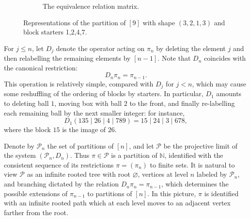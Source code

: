 \documentclass{article}
\begin{document}
\begin{figure}[htbp]
    \begin{subfigure}[b]{\textwidth}
        \centering
        \caption{The equivalence relation matrix.}\label{subfig:MatrixRep}
    \end{subfigure}

    \vspace{1.5em}
    \caption{Representations of the partition of $[9]$ with shape $(3,2,1,3)$ and block starters 1,2,4,7.}
    \label{CanRep}
\end{figure}













For $j\le n$, let $D_j$ denote the operator acting on $\pi_n$ by deleting the element $j$ and then relabelling the remaining elements by $[n-1]$.
Note that $D_n$ coincides with the canonical restriction:
\[
D_n\pi_n=\pi_{n-1}.
\]
This operation is relatively simple, compared with $D_j$ for $j<n$, which may cause some reshuffling of the ordering of blocks by starters.
In particular, $D_1$ amounts to deleting ball $1$, moving 
 box  with ball $2$ to the front, and finally
re-labelling each remaining ball by the next smaller integer: for instance,
\[
D_1(135 \mid 26 \mid 4 \mid 789)=15 \mid 24 \mid 3 \mid 678,
\]
where the block $15$ is the image of $26$.



Denote by $\mathcal P_n$ the set of partitions of $[n]$, and let $\mathcal P$ be the projective limit of the system $(\mathcal P_n,D_n)$.
Thus $\pi\in\mathcal P$ is a partition of $\mathbb N$, identified with the consistent sequence of its restrictions
$\pi=(\pi_n)$ to finite sets.
It is natural to view $\mathcal P$ as an infinite rooted tree with root $\varnothing$, vertices at level $n$ labeled by $\mathcal P_n$,
and branching dictated by the relation $D_n\pi_n=\pi_{n-1}$, which determines the possible extensions of $\pi_{n-1}$ to partitions of $[n]$.
In this picture, $\pi$ is identified with an infinite rooted path which at each level moves to an adjacent vertex farther from the root.
\end{document}
